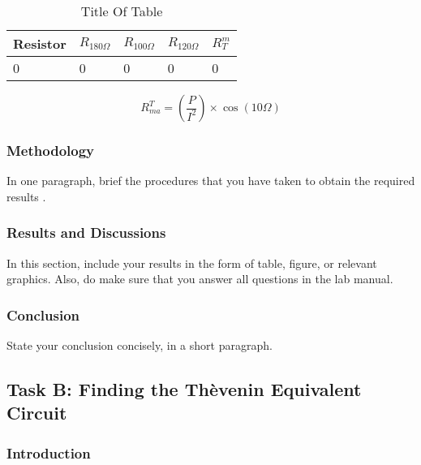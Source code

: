 \documentclass[11pt,times]{eeereport}
\begin{document}
\begin{table}[h]
\centering
\label{tab:table123}
\caption{Title Of Table}
\begin{tabular}{|p{3cm}|p{1.5cm}|p{1.5cm}|p{1.5cm}|p{1.5cm}|}
\hline
Resistor & $R_{180\Omega}$ & $R_{100\Omega}$ & $R_{120\Omega}$ & $R_T^m$\\
\hline
0 & 0 & 0 & 0 & 0 \\
\hline
\end{tabular}
\end{table}

\begin{equation}\label{equ:e1}
R_{ma}^T=\left(\frac{P}{I^2}\right) \times \cos(10\Omega) 
\end{equation}



\subsubsection{Methodology}
In one paragraph, brief the procedures that you have taken to obtain the required results \cite{1292241}.

\subsubsection{Results and Discussions}
In this section, include your results in the form of table, figure, or relevant graphics.  Also, do make sure that you answer all questions in the lab manual. 

\subsubsection{Conclusion}
State your conclusion concisely, in a short paragraph.

\subsection{Task B: Finding the Th\`{e}venin Equivalent Circuit}
\subsubsection{Introduction}
\end{document}
